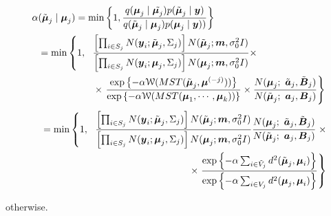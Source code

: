 \begin{enumerate}
\begin{align*}
\alpha&( \tilde{\bfmu}_j \mid \bfmu_j) = \min\left\{ 1, \frac{q(\bfmu_j \mid \tilde{\bfmu_j}) p(\tilde{\bfmu}_j\mid \bfy)}{q(\tilde{\bfmu}_j \mid \bfmu_j)p(\bfmu_j \mid \bfy))}\right\}\\
&=\min \left\{ 1, \ \ \frac{ \left[ \prod_{i\in S_j} N(\bfy_i; \tilde{\bfmu}_j, \Sigma_{j}) \right] N(\tilde{\bfmu}_j; \bfm, \sigma^2_0I)}{   \left[ \prod_{i\in S_j} N(\bfy_i; \bfmu_j, \Sigma_j) \right] N(\bfmu_j; \bfm, \sigma^2_0I) } \times \right.\\
&\hspace{2 cm} \times \left. \frac{\exp\left\{-\alpha\mathcal{W}( MST(\tilde{\bfmu}_j, \bfmu^{(-j)}) ) \right\}}{\exp\left\{-\alpha\mathcal{W}( MST(\bfmu_1, \cdots, \bfmu_k) ) \right\} } \times \frac{N(\bfmu_j; \ \tilde{\bfa}_j, \tilde{\bfB}_j)}{N(\tilde{\bfmu}_j; \ \bfa_j, \bfB_j)} \right\}
\end{align*}
\begin{align*}
\ \ \ \ =\min \left\{1, \ \ \frac{ \left[ \prod_{i\in S_j} N(\bfy_i; \tilde{\bfmu}_j, \Sigma_{j}) \right] N(\tilde{\bfmu}_j; \bfm, \sigma^2_0I) }{   \left[ \prod_{i\in S_j} N(\bfy_i; \bfmu_j, \Sigma_j) \right] N(\bfmu_j; \bfm, \sigma^2_0I)}\frac{N(\bfmu_j; \ \tilde{\bfa}_j, \tilde{\bfB}_j)}{N(\tilde{\bfmu}_j; \ \bfa_j, \bfB_j)} \right. \times\\
\times\left. \frac{\exp\left\{-\alpha \sum_{i \in \tilde{V}_j} d^2(\tilde{\bfmu}_j, \bfmu_i) \right\}}{  \exp\left\{-\alpha\sum_{i \in V_j} d^2(\bfmu_j, \bfmu_i) \right\}  } \right\}
\end{align*}

\noindent otherwise.

\end{enumerate}
